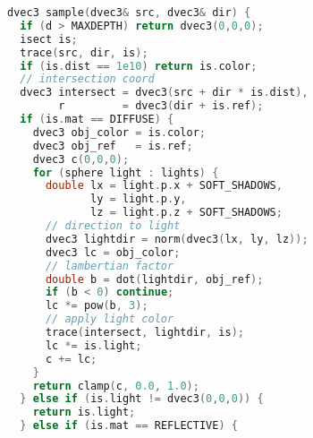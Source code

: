 \headerfooteroff{}
\pagecolor{black!5}\afterpage{\nopagecolor}
\begin{lstlisting}[language=C]
dvec3 sample(dvec3& src, dvec3& dir) {
  if (d > MAXDEPTH) return dvec3(0,0,0);
  isect is;
  trace(src, dir, is);
  if (is.dist == 1e10) return is.color;
  // intersection coord
  dvec3 intersect = dvec3(src + dir * is.dist),        
        r         = dvec3(dir + is.ref);
  if (is.mat == DIFFUSE) {
    dvec3 obj_color = is.color;
    dvec3 obj_ref   = is.ref;
    dvec3 c(0,0,0);
    for (sphere light : lights) {
      double lx = light.p.x + SOFT_SHADOWS,
             ly = light.p.y,
             lz = light.p.z + SOFT_SHADOWS;
      // direction to light
      dvec3 lightdir = norm(dvec3(lx, ly, lz));
      dvec3 lc = obj_color;
      // lambertian factor
      double b = dot(lightdir, obj_ref);
      if (b < 0) continue;
      lc *= pow(b, 3);
      // apply light color
      trace(intersect, lightdir, is);
      lc *= is.light;
      c += lc;
    }
    return clamp(c, 0.0, 1.0);
  } else if (is.light != dvec3(0,0,0)) {
    return is.light;
  } else if (is.mat == REFLECTIVE) {
\end{lstlisting}
\clearpage
\headerfooteron{}

